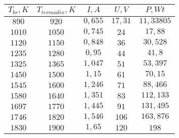 \begin{tabular}{| c | c | c | c | c |}
\hline
$T_{br}, K$ & $T_{termodin}, K$ & $I, A$ & $U, V$ & $P, Wt$\\
\hline
$890$ & $920$ & $0,655$ & $17,31$ & $11,33805$\\
\hline
$1010$ & $1050$ & $0,745$ & $24$ & $17,88$\\
\hline
$1120$ & $1150$ & $0,848$ & $36$ & $30,528$\\
\hline
$1235$ & $1280$ & $0,95$ & $44$ & $41,8$\\
\hline
$1325$ & $1365$ & $1,047$ & $51$ & $53,397$\\
\hline
$1450$ & $1500$ & $1,15$ & $61$ & $70,15$\\
\hline
$1545$ & $1600$ & $1,246$ & $71$ & $88,466$\\
\hline
$1580$ & $1640$ & $1,351$ & $83$ & $112,133$\\
\hline
$1697$ & $1770$ & $1,445$ & $91$ & $131,495$\\
\hline
$1746$ & $1820$ & $1,546$ & $106$ & $163,876$\\
\hline
$1830$ & $1900$ & $1,65$ & $120$ & $198$\\
\hline
\end{tabular}
